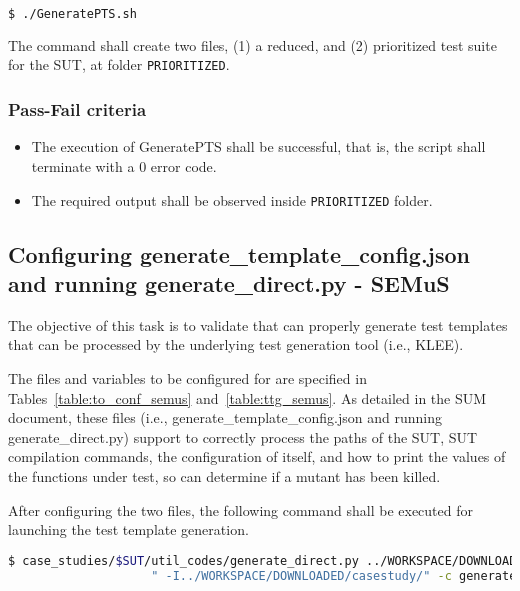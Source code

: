 \begin{lstlisting}[language=bash]
  $ ./GeneratePTS.sh
\end{lstlisting}

The command shall create two files, (1) a reduced, and (2) prioritized test suite for the SUT, at folder \texttt{PRIORITIZED}.

\subsubsection{Pass-Fail criteria}

\begin{itemize}
  \item The execution of GeneratePTS shall be successful, that is, the script shall terminate with a 0 error code.
  \item The required output shall be observed inside \texttt{PRIORITIZED} folder.
\end{itemize}



\subsection{Configuring generate\_template\_config.json and running generate\_direct.py - SEMuS}




The objective of this task is to validate that \SEMUS can properly generate test templates that can be processed by the underlying test generation tool (i.e., KLEE).

The files and variables to be configured for \SEMUS are specified in Tables~\ref{table:to_conf_semus} and~\ref{table:ttg_semus}. As detailed in the SUM document, these files (i.e., generate\_template\_config.json and running generate\_direct.py) support \SEMUS to correctly process the paths of the SUT, SUT compilation commands, the configuration of \SEMUS itself, and how to print the values of the functions under test, so \SEMUS can determine if a mutant has been killed.

After configuring the two files, the following command shall be executed for launching the test template generation. 

\begin{lstlisting}[language=bash]
 $ case_studies/$SUT/util_codes/generate_direct.py ../WORKSPACE/DOWNLOADED/casestudy/test.c direct \
                    " -I../WORKSPACE/DOWNLOADED/casestudy/" -c generate_template_config.json
\end{lstlisting}


